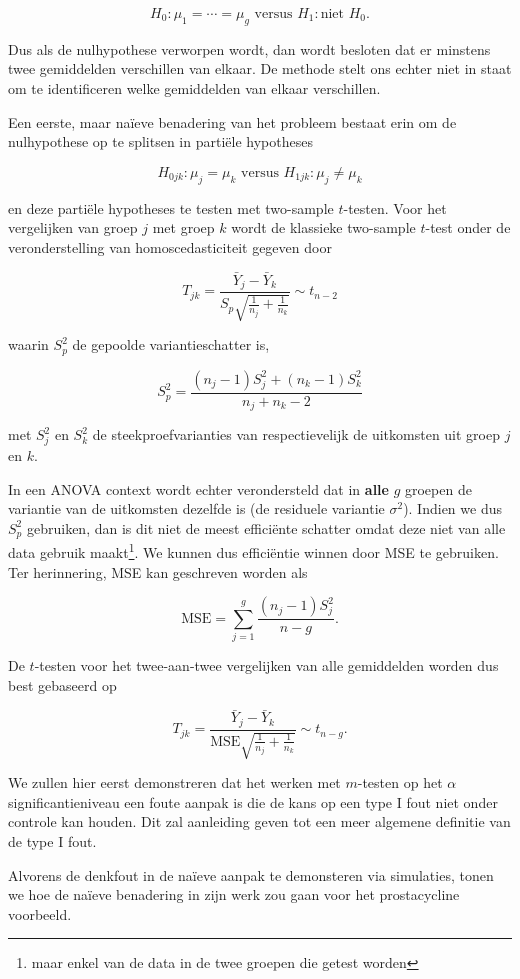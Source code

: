 \documentclass[
  12pt,dutch,coursenotes]{book}
\theoremstyle{definition}
\theoremstyle{definition}
\theoremstyle{definition}
\theoremstyle{definition}
\theoremstyle{remark}
\begin{document}
\[  H_0: \mu_1=\cdots = \mu_g \text{ versus } H_1: \text{niet } H_0.\]

Dus als de nulhypothese verworpen wordt, dan wordt besloten dat er minstens twee gemiddelden verschillen van elkaar. De methode stelt ons echter niet in staat om te identificeren welke gemiddelden van elkaar verschillen.

Een eerste, maar naïeve benadering van het probleem bestaat erin om de nulhypothese op te splitsen in partiële hypotheses

\[H_{0jk}: \mu_j=\mu_k \text{ versus } H_{1jk}: \mu_j \neq \mu_k\]

en deze partiële hypotheses te testen met two-sample \(t\)-testen. Voor het vergelijken van groep \(j\) met groep \(k\) wordt de klassieke two-sample \(t\)-test onder de veronderstelling van homoscedasticiteit gegeven door

\[T_{jk} = \frac{\bar{Y}_j-\bar{Y}_k}{S_p\sqrt{\frac{1}{n_j}+\frac{1}{n_k}}} \sim t_{n-2}\]

waarin \(S_p^2\) de gepoolde variantieschatter is,

\[S_p^2 = \frac{(n_j-1)S_j^2 + (n_k-1)S_k^2}{n_j+n_k-2}\]

met \(S_j^2\) en \(S_k^2\) de steekproefvarianties van respectievelijk de uitkomsten uit groep \(j\) en \(k\).

In een ANOVA context wordt echter verondersteld dat in \textbf{alle} \(g\) groepen de variantie van de uitkomsten dezelfde is (de residuele variantie \(\sigma^2\)). Indien we dus \(S_p^2\) gebruiken, dan is dit niet de meest efficiënte schatter omdat deze niet van alle data gebruik maakt\footnote{maar enkel van de data in de twee groepen die getest worden}. We kunnen dus efficiëntie winnen door MSE te gebruiken. Ter herinnering, MSE kan geschreven worden als

\[\text{MSE}= \sum_{j=1}^g \frac{(n_j-1)S_j^2}{n-g}.\]

De \(t\)-testen voor het twee-aan-twee vergelijken van alle gemiddelden worden dus best gebaseerd op

\[T_{jk} = \frac{\bar{Y}_j-\bar{Y}_k}{\text{MSE}\sqrt{\frac{1}{n_j}+\frac{1}{n_k}}} \sim t_{n-g}.\]

We zullen hier eerst demonstreren dat het werken met \(m\)-testen op het \(\alpha\) significantieniveau een foute aanpak is die de kans op een type I fout niet onder controle kan houden. Dit zal aanleiding geven tot een meer algemene definitie van de type I fout.

Alvorens de denkfout in de naïeve aanpak te demonsteren via simulaties, tonen we hoe de naïeve benadering in zijn werk zou gaan voor het prostacycline voorbeeld.
\end{document}
